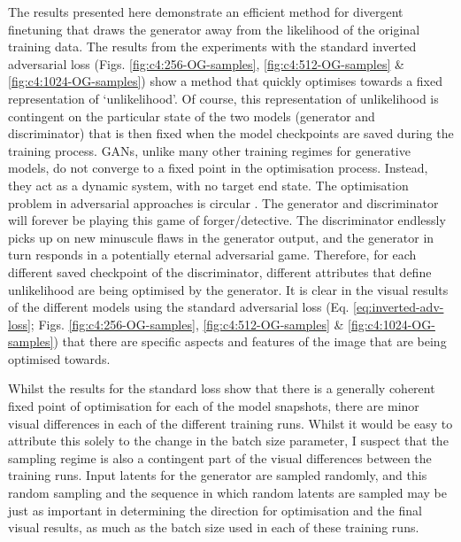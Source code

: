 The results presented here demonstrate an efficient method for divergent finetuning that draws the generator away from the likelihood of the original training data. 
The results from the experiments with the standard inverted adversarial loss (Figs. \ref{fig:c4:256-OG-samples}, \ref{fig:c4:512-OG-samples} \& \ref{fig:c4:1024-OG-samples}) show a method that quickly optimises towards a fixed representation of `unlikelihood'.
Of course, this representation of unlikelihood is contingent on the particular state of the two models (generator and discriminator) that is then fixed when the model checkpoints are saved during the training process.
GANs, unlike many other training regimes for generative models,  do not converge to a fixed point in the optimisation process.
Instead, they act as a dynamic system, with no target end state. 
The optimisation problem in adversarial approaches is circular \citep{nagarajan2017gradient}. 
The generator and discriminator will forever be playing this game of forger/detective. 
The discriminator endlessly picks up on new minuscule flaws in the generator output, and the generator in turn responds in a potentially eternal adversarial game.
Therefore, for each different saved checkpoint of the discriminator, different attributes that define unlikelihood are being optimised by the generator.
It is clear in the visual results of the different models using the standard adversarial loss (Eq. \ref{eq:inverted-adv-loss}; Figs. \ref{fig:c4:256-OG-samples}, \ref{fig:c4:512-OG-samples} \& \ref{fig:c4:1024-OG-samples}) that there are specific aspects and features of the image that are being optimised towards. 

Whilst the results for the standard loss show that there is a generally coherent fixed point of optimisation for each of the model snapshots, there are minor visual differences in each of the different training runs.
Whilst it would be easy to attribute this solely to the change in the batch size parameter, I suspect that the sampling regime is also a contingent part of the visual differences between the training runs.
Input latents for the generator are sampled randomly, and this random sampling and the sequence in which random latents are sampled may be just as important in determining the direction for optimisation and the final visual results, as much as the batch size used in each of these training runs. 

